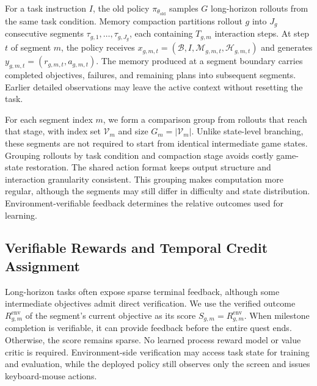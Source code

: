 For a task instruction $I$, the old policy $\pi_{\theta_{\mathrm{old}}}$ samples $G$ long-horizon rollouts from the same task condition. Memory compaction partitions rollout $g$ into $J_g$ consecutive segments $\tau_{g,1},\ldots,\tau_{g,J_g}$, each containing $T_{g,m}$ interaction steps. At step $t$ of segment $m$, the policy receives $x_{g,m,t}=(\mathcal B,I,\mathcal M_{g,m,t},\mathcal H_{g,m,t})$ and generates $y_{g,m,t}=(r_{g,m,t},a_{g,m,t})$. The memory produced at a segment boundary carries completed objectives, failures, and remaining plans into subsequent segments. Earlier detailed observations may leave the active context without resetting the task.

For each segment index $m$, we form a comparison group from rollouts that reach that stage, with index set $\mathcal V_m$ and size $G_m=|\mathcal V_m|$. Unlike state-level branching, these segments are not required to start from identical intermediate game states. Grouping rollouts by task condition and compaction stage avoids costly game-state restoration. The shared action format keeps output structure and interaction granularity consistent. This grouping makes computation more regular, although the segments may still differ in difficulty and state distribution. Environment-verifiable feedback determines the relative outcomes used for learning.

\subsection{Verifiable Rewards and Temporal Credit Assignment}
\label{sec:ta_grpo_reward}
\label{sec:temporal_credit}

Long-horizon tasks often expose sparse terminal feedback, although some intermediate objectives admit direct verification. We use the verified outcome $R_{g,m}^{\mathrm{env}}$ of the segment's current objective as its score $S_{g,m}=R_{g,m}^{\mathrm{env}}$. When milestone completion is verifiable, it can provide feedback before the entire quest ends. Otherwise, the score remains sparse. No learned process reward model or value critic is required. Environment-side verification may access task state for training and evaluation, while the deployed policy still observes only the screen and issues keyboard-mouse actions.

